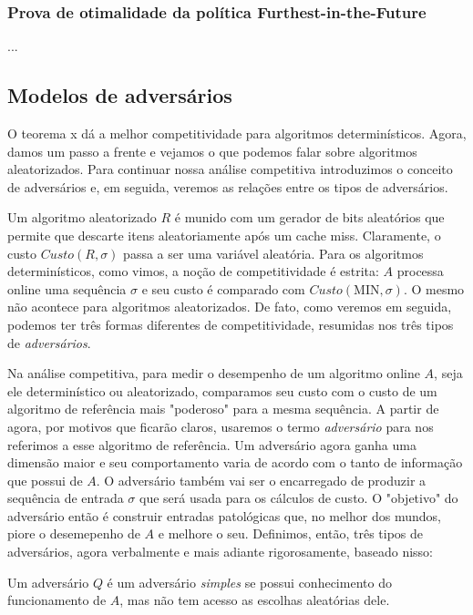 \documentclass[a4paper,oneside,reqno,12pt]{amsart}
\begin{document}
\subsubsection{Prova de otimalidade da política Furthest-in-the-Future}

...

\subsection{Modelos de adversários}

O teorema x dá a melhor competitividade para algoritmos determinísticos. Agora, damos um passo a frente e vejamos o que podemos falar sobre algoritmos aleatorizados. Para continuar nossa análise competitiva introduzimos o conceito de adversários e, em seguida, veremos as relações entre os tipos de adversários.

Um algoritmo aleatorizado $R$ é munido com um gerador de bits aleatórios que permite que descarte itens aleatoriamente após um cache miss. Claramente, o custo $Custo(R,\sigma)$ passa a ser uma variável aleatória. Para os algoritmos determinísticos, como vimos, a noção de competitividade é estrita: $A$ processa online uma sequência $\sigma$ e seu custo é comparado com $Custo(\text{MIN}, \sigma)$. O mesmo não acontece para algoritmos aleatorizados. De fato, como veremos em seguida, podemos ter três formas diferentes de competitividade, resumidas nos três tipos de \textit{adversários}. 

Na análise competitiva, para medir o desempenho de um algoritmo online $A$, seja ele determinístico ou aleatorizado, comparamos seu custo com o custo de um algoritmo de referência mais "poderoso" para a mesma sequência. 
A partir de agora, por motivos que ficarão claros, usaremos o termo \textit{adversário} para nos referimos a esse algoritmo de referência. Um adversário agora ganha uma dimensão maior e seu comportamento varia de acordo com o tanto de informação que possui de $A$. O adversário também vai ser o encarregado de produzir a sequência de entrada $\sigma$ que será usada para os cálculos de custo. O "objetivo" do adversário então é construir entradas patológicas que, no melhor dos mundos, piore o desemepenho de $A$ e melhore o seu. Definimos, então, três tipos de adversários, agora verbalmente e mais adiante rigorosamente, baseado nisso:

\begin{definition}
  Um adversário $Q$ é um adversário \textit{simples} se possui conhecimento do funcionamento de $A$, mas não tem acesso as escolhas aleatórias dele.
\end{definition}
\end{document}
